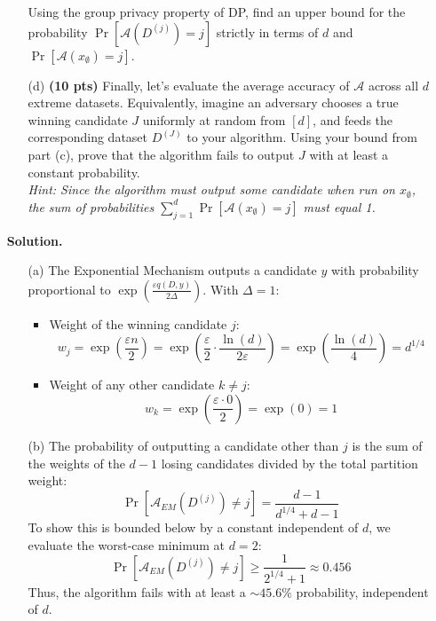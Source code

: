 \documentclass[12pt]{article}
\begin{document}
\begin{enumerate}
\begin{enumerate}
    Using the group privacy property of DP, find an upper bound for the probability $\Pr[\mathcal{A}(D^{(j)}) = j]$ strictly in terms of $d$ and $\Pr[\mathcal{A}(x_{\emptyset}) = j]$.
    
    \item[(d)] \textbf{(10 pts)} Finally, let's evaluate the average accuracy of $\mathcal{A}$ across all $d$ extreme datasets. Equivalently, imagine an adversary chooses a true winning candidate $J$ uniformly at random from $[d]$, and feeds the corresponding dataset $D^{(J)}$ to your algorithm. 
    Using your bound from part (c), prove that the algorithm fails to output $J$ with at least a constant probability. \\
    \textit{Hint: Since the algorithm must output \textit{some} candidate when run on $x_{\emptyset}$, the sum of probabilities $\sum_{j=1}^d \Pr[\mathcal{A}(x_{\emptyset}) = j]$ must equal 1.}
\end{enumerate}


\begin{solution}
\textbf{Solution.}\\
\begin{enumerate}
    \item[(a)] 
    The Exponential Mechanism outputs a candidate $y$ with probability proportional to $\exp\left(\frac{\varepsilon q(D,y)}{2\Delta}\right)$. With $\Delta = 1$:
    \begin{itemize}
        \item Weight of the winning candidate $j$: 
        \[ w_j = \exp\left(\frac{\varepsilon n}{2}\right) = \exp\left(\frac{\varepsilon}{2} \cdot \frac{\ln(d)}{2\varepsilon}\right) = \exp\left(\frac{\ln(d)}{4}\right) = d^{1/4} \]
        \item Weight of any other candidate $k \neq j$: 
        \[ w_k = \exp\left(\frac{\varepsilon \cdot 0}{2}\right) = \exp(0) = 1 \]
    \end{itemize}

    \item[(b)] 
    The probability of outputting a candidate other than $j$ is the sum of the weights of the $d-1$ losing candidates divided by the total partition weight:
    \[
    \Pr[\mathcal{A}_{EM}(D^{(j)}) \neq j] = \frac{d-1}{d^{1/4} + d - 1}
    \]
    To show this is bounded below by a constant independent of $d$, we evaluate the worst-case minimum at $d=2$:
    \[
    \Pr[\mathcal{A}_{EM}(D^{(j)}) \neq j] \ge \frac{1}{2^{1/4} + 1} \approx 0.456
    \]
    Thus, the algorithm fails with at least a $\sim 45.6\%$ probability, independent of $d$.


\end{enumerate}
\end{solution}
\end{enumerate}
\end{document}
